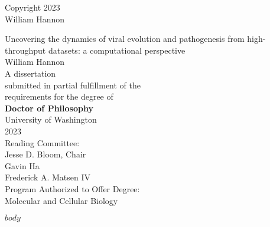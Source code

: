 \documentclass[12pt,oneside,letterpaper]{report}
\begin{document}
\thispagestyle{empty}
\begin{center}
\textcopyright{} Copyright 2023 \\
William Hannon
\end{center}
\vspace*{\fill}
\newpage

\begin{singlespace}
\thispagestyle{empty}
\begin{center}
\huge{Uncovering the dynamics of viral evolution and pathogenesis from high-throughput datasets: a computational perspective} \\
\vspace{2cm}
\Large{William Hannon} \\
\vspace{2cm}
A dissertation \\
submitted in partial fulfillment of the \\
requirements for the degree of \\
\vspace{1cm}
\textbf{Doctor of Philosophy} \\
\vspace{1cm}
University of Washington \\
2023 \\
\vspace{1cm}
Reading Committee: \\
Jesse D. Bloom, Chair \\
Gavin Ha \\
Frederick A. Matsen IV \\
\vspace{1cm}
Program Authorized to Offer Degree: \\
Molecular and Cellular Biology
\end{center}
\end{singlespace}
\newpage


\newpage

\tableofcontents
\newpage



\newpage

$body$
\newpage



\end{document}
